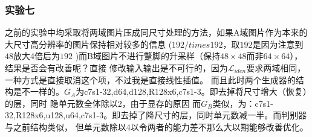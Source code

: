 \documentclass{beamer}
\begin{document}
\begin{frame}
\frametitle{实验七}

之前的实验中均采取将两域图片压成同尺寸处理的方法，如果A域图片作为本来的大尺寸高分辨率的图片保持相对较多的信息
($192/times 192$，取$192$是因为注意到$48$放大4倍后为$192$
)而B域图片不进行蹩脚的升采样（保持$48\times 48$而非$64\times 64$），结果是否会有改善呢？直接
修改输入输出是不可行的，因为$\mathcal{L}_{iden}$要求两域相同，一种方式是直接取消这个项，不过我是直接线性插值。
而且此时两个生成器的结构是不一样的。$G_A$为c7s1-32,d64,d128,R128x6,c7s1-3。即去掉将尺寸增大（恢复）的层，同时
隐单元数全体除以2，由于显存的原因
而$G_B$类似，为：c7s1-32,R128x6,u128,u64,c7s1-3。即去掉了降尺寸的层，同时单元数减一半。而判别器与之前结构类似，
但单元数除以4以令两者的能力差不那么大以期能够改善优化。

\end{frame}
\end{document}
